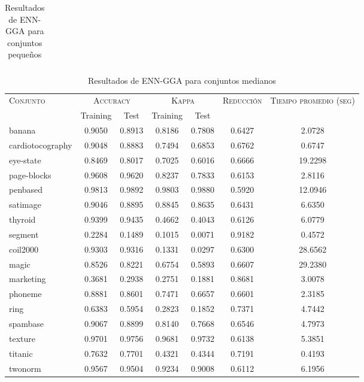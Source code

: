 \begin{table}[]
\begin{tabular}{l c c c c c c}
\hline
\end{tabular}
\caption{Resultados de ENN-GGA para conjuntos pequeños }
\label{res-peq-enn-gga}
\end{table}



\begin{table}[]
\centering
\begin{tabular}{l c c c c c c}
\hline
\multirow{2}{*}{\textsc{Conjunto}}
	& \multicolumn{2}{c}{\textsc{Accuracy}}
	& \multicolumn{2}{c}{\textsc{Kappa}}
	& \textsc{Reducción}
	& \textsc{Tiempo promedio (seg)} \\
	& Training & Test
	& Training & Test \\ 
\hline
\hline

banana & 0.9050 & 0.8913 & 0.8186 & 0.7808 & 0.6427 & 2.0728 \\
cardiotocography & 0.9048 & 0.8883 & 0.7494 & 0.6853 & 0.6762 & 0.6747 \\
eye-state & 0.8469 & 0.8017 & 0.7025 & 0.6016 & 0.6666 & 19.2298 \\
page-blocks & 0.9608 & 0.9620 & 0.8237 & 0.7833 & 0.6153 & 2.8116 \\
penbased & 0.9813 & 0.9892 & 0.9803 & 0.9880 & 0.5920 & 12.0946 \\
satimage & 0.9046 & 0.8895 & 0.8845 & 0.8635 & 0.6431 & 6.6350 \\
thyroid & 0.9399 & 0.9435 & 0.4662 & 0.4043 & 0.6126 & 6.0779 \\
segment & 0.2284 & 0.1489 & 0.1015 & 0.0071 & 0.9182 & 0.4572 \\
coil2000 & 0.9303 & 0.9316 & 0.1331 & 0.0297 & 0.6300 & 28.6562 \\
magic & 0.8526 & 0.8221 & 0.6754 & 0.5893 & 0.6607 & 29.2380 \\
marketing & 0.3681 & 0.2938 & 0.2751 & 0.1881 & 0.8681 & 3.0078 \\
phoneme & 0.8881 & 0.8601 & 0.7471 & 0.6657 & 0.6601 & 2.3185 \\
ring & 0.6383 & 0.5954 & 0.2823 & 0.1852 & 0.7371 & 4.7442 \\
spambase & 0.9067 & 0.8899 & 0.8140 & 0.7668 & 0.6546 & 4.7973 \\
texture & 0.9701 & 0.9756 & 0.9681 & 0.9732 & 0.6138 & 5.3851 \\
titanic & 0.7632 & 0.7701 & 0.4321 & 0.4344 & 0.7191 & 0.4193 \\
twonorm & 0.9567 & 0.9504 & 0.9234 & 0.9008 & 0.6112 & 6.1956 \\

\hline
\end{tabular}
\caption{Resultados de ENN-GGA para conjuntos medianos }
\label{res-med-enn-gga}
\end{table}



